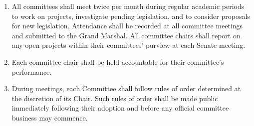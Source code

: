 \documentclass{bylaws}
\begin{document}
\begin{enumerate}
\item All committees shall meet twice per month during regular academic periods to work on projects, investigate pending
legislation, and to consider proposals for new legislation. Attendance shall be recorded at all committee meetings and submitted
to the Grand Marshal. All committee chairs shall report on any open projects within their committees’ purview at each Senate
meeting.

\item Each committee chair shall be held accountable for their committee’s performance.

\item During meetings, each Committee shall follow rules of order determined at the discretion of its Chair. Such rules of order shall
be made public immediately following their adoption and before any official committee business may commence.


\end{enumerate}
\end{document}
